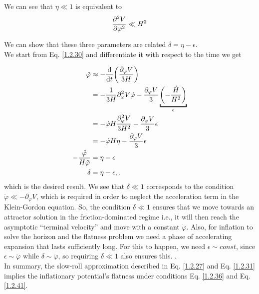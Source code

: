 We can see that \(\eta \ll 1 \) is equivalent to
\begin{align}
    \pdv[2]{V}{\varphi} \ll H^2 \label{1.2.42}
\end{align}

We can show that these three parameters are related  \(\delta = \eta - \epsilon \).\\
We start from Eq. \eqref{1.2.30} and differentiate it with respect to the time we get 

\begin{align}
    \ddot{\varphi} &\approx - \dv{}{t} \qty( \frac{\partial_{\varphi} V}{3H})  \\ &= - \frac{1}{3H} \partial^{2} _{\varphi} V \dot{\varphi} - \frac{\partial_{\varphi} V}{3} \underbracket{\qty(- \frac{\dot{H}}{H^2})}_{\epsilon }  \\ &= - \dot{\varphi} H \frac{\partial^{2} _{\varphi} V}{3H^2} - \frac{\partial_{\varphi} V}{3} \epsilon  \\ &= - \dot{\varphi} H \eta - \frac{\partial_{\varphi} V}{3} \epsilon  \\ {-\frac{\ddot{\varphi}}{H \ddot{\varphi}}} &= \eta - \epsilon  \\
    \delta &= \eta - \epsilon,.\label{1.2.48}
\end{align}
which is the desired result.
We see that $\delta \ll 1 $ corresponds to the condition $\ddot{\varphi} \ll -\partial_{\varphi} V$, which is required in order to neglect the acceleration term in the Klein-Gordon equation. So, the condition  $\delta \ll 1 $ ensures that we move towards an attractor solution in the friction-dominated regime i.e., it will then reach the asymptotic “terminal velocity” and move with a constant $\dot{\varphi}$. Also, for inflation to solve the horizon and the flatness problem we need a phase of accelerating expansion that lasts sufficiently long. For this to happen, we need $\epsilon \sim const$, since $\epsilon \sim \dot{\varphi}$ while $\delta \sim \ddot{\varphi}$, so requiring $\delta \ll 1$ also ensures this.
.\\
\hspace{0.5cm}In summary, the slow-roll approximation described in Eq. \eqref{1.2.27} and Eq. \eqref{1.2.31} implies the inflationary potential's flatness under conditions Eq. \eqref{1.2.36} and Eq. \eqref{1.2.41}.\\



